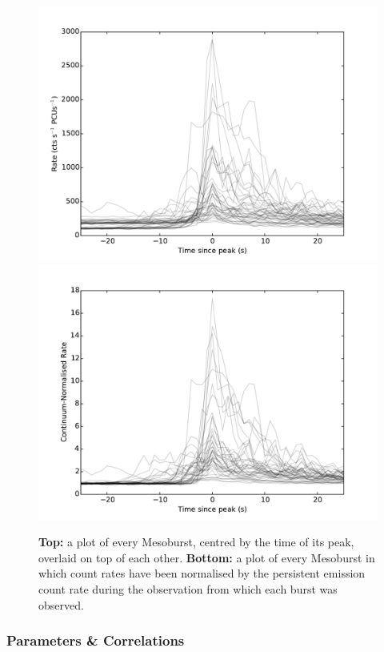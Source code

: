 \begin{figure}
  \centering
  \includegraphics[width=.9\linewidth, trim={0.4cm 0 1.1cm 0},clip]{images/1000meso.pdf}
  \includegraphics[width=.9\linewidth, trim={0.4cm 0 1.1cm 0},clip]{images/1000meso_renormed.pdf}
  \caption[A plot of every Mesoburst, centred by the time of its peak, overlaid on top of each other.]{\small  \textbf{Top:} a plot of every Mesoburst, centred by the time of its peak, overlaid on top of each other.  \textbf{Bottom:} a plot of every Mesoburst in which count rates have been normalised by the persistent emission count rate during the observation from which each burst was observed.}
  \label{fig:meso_over}
\end{figure}

\subsubsection{Parameters \& Correlations}

